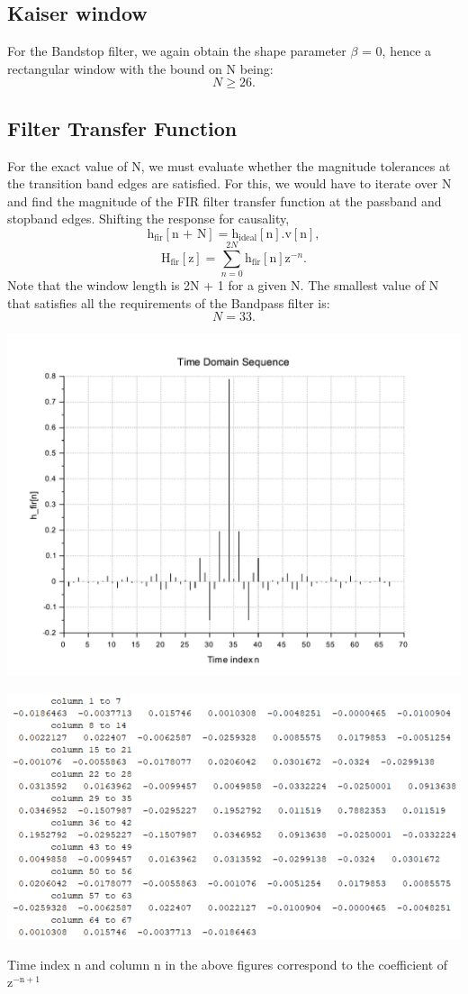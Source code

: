 \documentclass[12pt]{article}
\begin{document}
\subsection{Kaiser window}
For the Bandstop filter, we again obtain the shape parameter $\beta$ = 0, hence a rectangular window with the bound on N being:\[N \ge 26.\]

\subsection{Filter Transfer Function}
For the exact value of N, we must evaluate whether the magnitude tolerances at the transition band edges are satisfied. For this, we would have to iterate over N and find the magnitude of the FIR filter transfer function at the passband and stopband edges. Shifting the response for causality,
\[\text{h}_\text{fir}[\text{n + N}] = \text{h}_\text{ideal}[\text{n}].\text{v}[\text{n}],\]
\[\text{H}_\text{fir}[\text{z}] = \sum_{n = 0}^{2N}\text{h}_\text{fir}[\text{n}]\text{z}^{-n}.\]
Note that the window length is 2N + 1 for a given N. The smallest value of N that satisfies all the requirements of the Bandpass filter is:\[N = 33.\]
\begin{center}
    \includegraphics[width=\textwidth]{time_bs.pdf}
\end{center}
\begin{center}
    \includegraphics[width=\textwidth]{h_fir_bs.png}
\end{center}
Time index n and column n in the above figures correspond to the coefficient of $\text{z}^{-\text{n}+1}$
\end{document}
